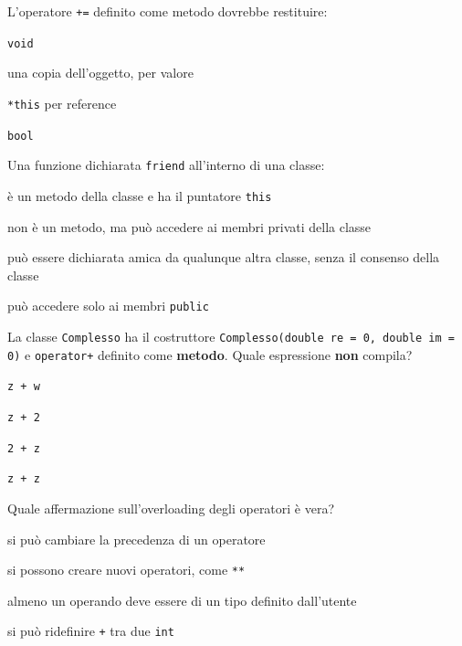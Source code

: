 \begin{quiz}{L'operatore \texttt{+=} definito come metodo dovrebbe restituire:}
  \item \texttt{void}
  \item una copia dell'oggetto, per valore
  \item \texttt{*this} per reference
  \item \texttt{bool}
\end{quiz}

\begin{quiz}{Una funzione dichiarata \texttt{friend} all'interno di una classe:}
  \item è un metodo della classe e ha il puntatore \texttt{this}
  \item non è un metodo, ma può accedere ai membri privati della classe
  \item può essere dichiarata amica da qualunque altra classe, senza il consenso della classe
  \item può accedere solo ai membri \texttt{public}
\end{quiz}

\begin{quiz}{La classe \texttt{Complesso} ha il costruttore \texttt{Complesso(double re = 0, double im = 0)} e \texttt{operator+} definito come \textbf{metodo}. Quale espressione \textbf{non} compila?}
  \item \texttt{z + w}
  \item \texttt{z + 2}
  \item \texttt{2 + z}
  \item \texttt{z + z}
\end{quiz}

\begin{quiz}{Quale affermazione sull'overloading degli operatori è vera?}
  \item si può cambiare la precedenza di un operatore
  \item si possono creare nuovi operatori, come \texttt{**}
  \item almeno un operando deve essere di un tipo definito dall'utente
  \item si può ridefinire \texttt{+} tra due \texttt{int}
\end{quiz}

